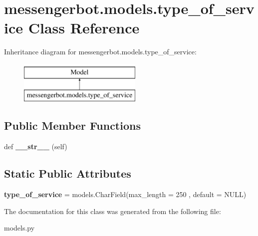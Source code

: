 \hypertarget{classmessengerbot_1_1models_1_1type__of__service}{}\section{messengerbot.\+models.\+type\+\_\+of\+\_\+service Class Reference}
\label{classmessengerbot_1_1models_1_1type__of__service}
Inheritance diagram for messengerbot.\+models.\+type\+\_\+of\+\_\+service\+:\begin{figure}[H]
\begin{center}
\leavevmode
\includegraphics[height=2.000000cm]{classmessengerbot_1_1models_1_1type__of__service}
\end{center}
\end{figure}
\subsection*{Public Member Functions}
\begin{DoxyCompactItemize}
\item 
\mbox{\label{classmessengerbot_1_1models_1_1type__of__service_ab573c9cf8659e781a2c3ddd8741ff7d2}} 
def {\bfseries \+\_\+\+\_\+str\+\_\+\+\_\+} (self)
\end{DoxyCompactItemize}
\subsection*{Static Public Attributes}
\begin{DoxyCompactItemize}
\item 
\mbox{\label{classmessengerbot_1_1models_1_1type__of__service_a00cc860399c8c70331308d118f5677c9}} 
{\bfseries type\+\_\+of\+\_\+service} = models.\+Char\+Field(max\+\_\+length = 250 , default = \textquotesingle{}N\+U\+LL\textquotesingle{})
\end{DoxyCompactItemize}


The documentation for this class was generated from the following file\+:\begin{DoxyCompactItemize}
\item 
models.\+py\end{DoxyCompactItemize}
